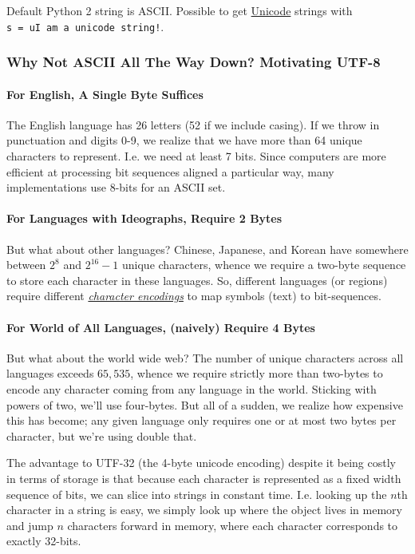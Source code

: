 \documentclass[12pt,letterpaper,twoside]{article}
\begin{document}
Default Python 2 string is ASCII. Possible to get \href{https://en.wikipedia.org/wiki/Unicode}{Unicode} strings with \newline
\texttt{s\ =\ u\textquotesingle{}I\ am\ a\ unicode\
  string!\textquotesingle{}}.

\subsubsection{Why Not ASCII All The Way Down? Motivating UTF-8}
\paragraph{For English, A Single Byte Suffices}
The English language has
26 letters (52 if we include casing). If we throw in punctuation and
digits 0-9, we realize that we have more than 64 unique characters to
represent. I.e. we need at least 7 bits. Since computers are more
efficient at processing bit sequences aligned a particular way, many
implementations use 8-bits for an ASCII set. 

\paragraph{For Languages with Ideographs, Require 2 Bytes}
But what about other languages? Chinese,
Japanese, and Korean have somewhere between $2^8$ and $2^{16} - 1$
unique characters, whence we
require a two-byte
sequence to store each character in these languages.
So, different languages (or regions) require different
\href{https://en.wikipedia.org/wiki/Character_encoding#Common_character_encodings}{\emph{character
    encodings}} to map symbols (text) to bit-sequences.

\paragraph{For World of All Languages, (naively) Require 4 Bytes}
But what about
the world wide web? The number of unique characters across all
languages exceeds $65,535$, whence we require strictly more than
two-bytes to encode any character coming from any language in the
world. Sticking with powers of two, we'll use four-bytes. But all of a
sudden, we realize how expensive this has become; any given language
only requires one or at most two bytes per character, but we're using
double that.

The advantage to UTF-32 (the 4-byte unicode encoding) despite it being
costly in terms of storage is that because each character is
represented as a fixed width sequence of bits, we can slice into
strings in constant time. I.e. looking up the $n$th character in a
string is easy, we simply look up where the object lives in memory and
jump $n$ characters forward in memory, where each character
corresponds to exactly 32-bits.
\end{document}
